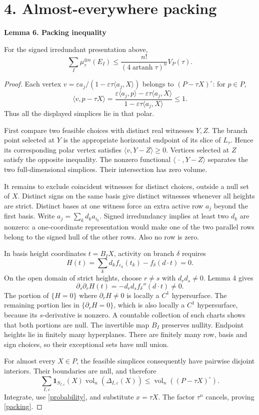 \documentclass[11pt,a4paper]{article}
\newenvironment{statement}[1]{\begin{tcolorbox}[proofbox]\textbf{#1}\par\smallskip}{\end{tcolorbox}}
\newcommand{\vol}{\operatorname{vol}_n}
\newcommand{\artanh}{\operatorname{artanh}}
\newcommand{\pair}[2]{\langle #1,#2\rangle}
\newcommand{\sect}[1]{\section*{#1}}
\begin{document}
\newpage
\sect{4. Almost-everywhere packing}
\begin{statement}{Lemma 6. Packing inequality}
For the signed irredundant presentation above,
\begin{equation}\label{packing}
 \sum_I\mu_\tau^{\otimes n}(E_I)
 \leq\frac{n!}{(4\artanh\tau)^n}V_P(\tau).
\end{equation}
\end{statement}
\begin{proof}
Each vertex $v=\varepsilon a_j/(1-\varepsilon\tau\pair{a_j}X)$ belongs
to $(P-\tau X)^\circ$: for $p\in P$,
\[
 \pair v{p-\tau X}
 =\frac{\varepsilon\pair{a_j}p-\varepsilon\tau\pair{a_j}X}
 {1-\varepsilon\tau\pair{a_j}X}\leq1.
\]
Thus all the displayed simplices lie in that polar.

First compare two feasible choices with distinct real witnesses $Y,Z$.
The branch point selected at $Y$ is the appropriate horizontal endpoint
of its slice of $L_\tau$. Hence its corresponding polar vertex satisfies
$\pair v{Y-Z}\geq0$. Vertices selected at $Z$ satisfy the opposite
inequality. The nonzero functional $\pair{\,\cdot\,}{Y-Z}$ separates
the two full-dimensional simplices. Their intersection has zero volume.

It remains to exclude coincident witnesses for distinct choices, outside
a null set of $X$. Distinct signs on the same basis give distinct
witnesses whenever all heights are strict. Distinct bases at one witness
force an extra active row $a_j$ beyond the first basis. Write
$a_j=\sum_k d_k a_{i_k}$. Signed irredundancy implies at least two $d_k$
are nonzero: a one-coordinate representation would make one of the two
parallel rows belong to the signed hull of the other rows. Also no row
is zero.

In basis height coordinates $t=B_IX$, activity on branch $\delta$ requires
\[
 H(t)=\sum_k d_k f_{\varepsilon_k}(t_k)-f_\delta(d\cdot t)=0.
\]
On the open domain of strict heights, choose $r\ne s$ with $d_rd_s\ne0$.
Lemma 4 gives
\[
 \partial_s\partial_r H(t)=-d_rd_s f_\delta''(d\cdot t)\ne0.
\]
The portion of $\{H=0\}$ where $\partial_rH\ne0$ is locally a
$C^1$ hypersurface. The remaining portion lies in
$\{\partial_rH=0\}$, which is also locally a $C^1$ hypersurface,
because its $s$-derivative is nonzero. A countable collection of such
charts shows that both portions are null. The invertible map $B_I$
preserves nullity. Endpoint heights lie in finitely many hyperplanes.
There are finitely many row, basis and sign choices, so their exceptional
sets have null union.

For almost every $X\in P$, the feasible simplices consequently have
pairwise disjoint interiors. Their boundaries are null, and therefore
\[
 \sum_{I,\varepsilon}\mathbf1_{S_{I,\varepsilon}}(X)
       \vol(\Delta_{I,\varepsilon}(X))
 \leq\vol((P-\tau X)^\circ).
\]
Integrate, use \eqref{probability}, and substitute $x=\tau X$.
The factor $\tau^n$ cancels, proving \eqref{packing}.
\end{proof}
\end{document}
